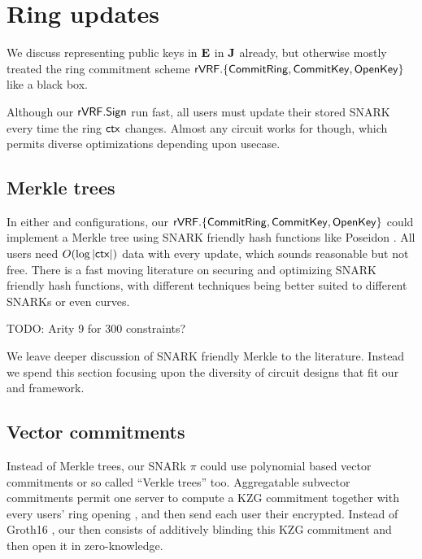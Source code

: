 \section{Ring updates}
\label{sec:ring_updates}

We discuss \pifast representing public keys in ${\mathbf{E}}$ in ${\mathbf{J}}$ already,
but otherwise mostly treated the ring commitment scheme
${\mathsf{rVRF}}.\{ {\mathsf{CommitRing}}, {\mathsf{CommitKey}}, {\mathsf{OpenKey}} \}$ like a black box.

Although our ${\mathsf{rVRF}}.{\mathsf{Sign}}$ run fast, all users must update their
stored SNARK \pifast every time the ring $\mathsf{ctx}$ changes.
Almost any circuit works for \pifast though,
 which permits diverse optimizations depending upon usecase.


\subsection{Merkle trees} %

In either \pifast and \pisafe configurations, 
our ${\mathsf{rVRF}}.\{ {\mathsf{CommitRing}}, {\mathsf{CommitKey}}, {\mathsf{OpenKey}} \}$ could implement a
Merkle tree using SNARK friendly hash functions like Poseidon \cite{poseidon}.
%
All users need $O(\log |\mathsf{ctx}|)$ data with every update, which sounds
reasonable but not free.  There is a fast moving literature on securing
and optimizing SNARK friendly hash functions, with different techniques
being better suited to different SNARKs or even curves.

TODO: Arity 9 for 300 constraints?   %

We leave deeper discussion of SNARK friendly Merkle to the literature.
Instead we spend this section focusing upon the diversity of circuit
designs that fit our \pifast and \pisafe framework.


\subsection{Vector commitments}

Instead of Merkle trees, our SNARk $\pi$ could use polynomial based
vector commitments \cite{KZG} or so called ``Verkle trees'' \cite{??Verkle??} too.
%
Aggregatable subvector commitments \cite{aSVC} permit one server to
compute a KZG commitment \comring together with every users' ring opening
\openring,  and then send each user their \openring encrypted.
Instead of Groth16 \cite{groth16}, our \pisafe then consists
of additively blinding this KZG commitment and then open it in zero-knowledge.


